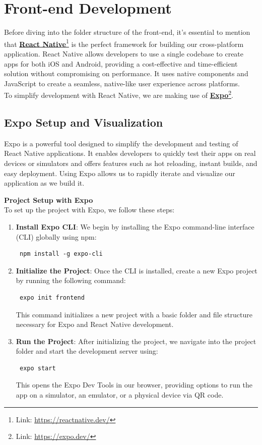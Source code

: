 \section{Front-end Development}
Before diving into the folder structure of the front-end, it’s essential to mention that \textbf{\href{https://reactnative.dev/}{React Native}}\footnote{Link: \url{https://reactnative.dev/}} is the perfect framework for building our cross-platform application. React Native allows developers to use a single codebase to create apps for both iOS and Android, providing a cost-effective and time-efficient solution without compromising on performance. It uses native components and JavaScript to create a seamless, native-like user experience across platforms.\vspace{5mm} \\
To simplify development with React Native, we are making use of \textbf{\href{https://expo.dev/}{Expo}}\footnote{Link: \url{https://expo.dev/}}.

\subsection{Expo Setup and Visualization}
Expo is a powerful tool designed to simplify the development and testing of React Native applications. It enables developers to quickly test their apps on real devices or simulators and offers features such as hot reloading, instant builds, and easy deployment. Using Expo allows us to rapidly iterate and visualize our application as we build it.\vspace{5mm}

\noindent \textbf{Project Setup with Expo} \\
\noindent To set up the project with Expo, we follow these steps:

\begin{enumerate}
    \item \textbf{Install Expo CLI}: We begin by installing the Expo command-line interface (CLI) globally using npm:
    \begin{verbatim} npm install -g expo-cli \end{verbatim}
    \item \textbf{Initialize the Project}: Once the CLI is installed, create a new Expo project by running the following command:
    \begin{verbatim} expo init frontend \end{verbatim}
    This command initializes a new project with a basic folder and file structure necessary for Expo and React Native development.
    \item \textbf{Run the Project}: After initializing the project, we navigate into the project folder and start the development server using:
    \begin{verbatim} expo start \end{verbatim}
    This opens the Expo Dev Tools in our browser, providing options to run the app on a simulator, an emulator, or a physical device via QR code.
\end{enumerate}

